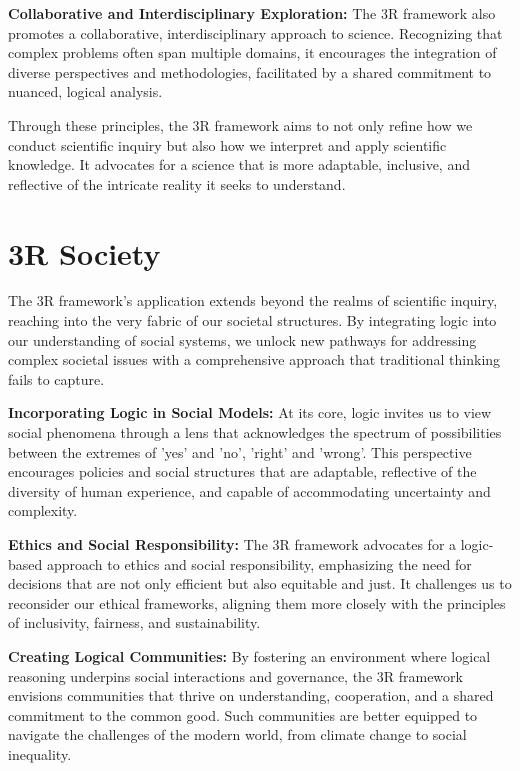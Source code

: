 \documentclass[12pt]{article}
\begin{document}
\textbf{Collaborative and Interdisciplinary Exploration:} The 3R framework also promotes a collaborative, interdisciplinary approach to science. Recognizing that complex problems often span multiple domains, it encourages the integration of diverse perspectives and methodologies, facilitated by a shared commitment to nuanced, logical analysis.

Through these principles, the 3R framework aims to not only refine how we conduct scientific inquiry but also how we interpret and apply scientific knowledge. It advocates for a science that is more adaptable, inclusive, and reflective of the intricate reality it seeks to understand.

\section*{3R Society}

The 3R framework’s application extends beyond the realms of scientific inquiry, reaching into the very fabric of our societal structures. By integrating \qbit{} logic into our understanding of social systems, we unlock new pathways for addressing complex societal issues with a comprehensive approach that traditional thinking fails to capture.

\textbf{Incorporating \qbit{} Logic in Social Models:} At its core, \qbit{} logic invites us to view social phenomena through a lens that acknowledges the spectrum of possibilities between the extremes of 'yes' and 'no', 'right' and 'wrong'. This perspective encourages policies and social structures that are adaptable, reflective of the diversity of human experience, and capable of accommodating uncertainty and complexity.

\textbf{Ethics and Social Responsibility:} The 3R framework advocates for a logic-based approach to ethics and social responsibility, emphasizing the need for decisions that are not only efficient but also equitable and just. It challenges us to reconsider our ethical frameworks, aligning them more closely with the principles of inclusivity, fairness, and sustainability.

\textbf{Creating Logical Communities:} By fostering an environment where logical reasoning underpins social interactions and governance, the 3R framework envisions communities that thrive on understanding, cooperation, and a shared commitment to the common good. Such communities are better equipped to navigate the challenges of the modern world, from climate change to social inequality.
\end{document}
